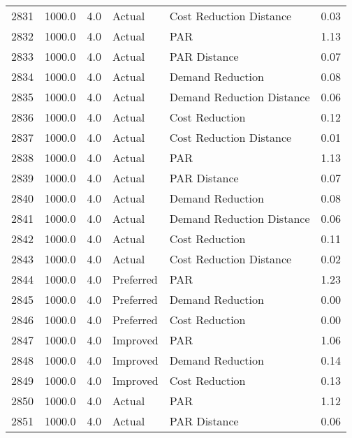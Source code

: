 \begin{longtable}{lrrllr}
2831 &       1000.0 &     4.0 &         Actual &    Cost Reduction Distance &   0.03 \\
2832 &       1000.0 &     4.0 &         Actual &                        PAR &   1.13 \\
2833 &       1000.0 &     4.0 &         Actual &               PAR Distance &   0.07 \\
2834 &       1000.0 &     4.0 &         Actual &           Demand Reduction &   0.08 \\
2835 &       1000.0 &     4.0 &         Actual &  Demand Reduction Distance &   0.06 \\
2836 &       1000.0 &     4.0 &         Actual &             Cost Reduction &   0.12 \\
2837 &       1000.0 &     4.0 &         Actual &    Cost Reduction Distance &   0.01 \\
2838 &       1000.0 &     4.0 &         Actual &                        PAR &   1.13 \\
2839 &       1000.0 &     4.0 &         Actual &               PAR Distance &   0.07 \\
2840 &       1000.0 &     4.0 &         Actual &           Demand Reduction &   0.08 \\
2841 &       1000.0 &     4.0 &         Actual &  Demand Reduction Distance &   0.06 \\
2842 &       1000.0 &     4.0 &         Actual &             Cost Reduction &   0.11 \\
2843 &       1000.0 &     4.0 &         Actual &    Cost Reduction Distance &   0.02 \\
2844 &       1000.0 &     4.0 &      Preferred &                        PAR &   1.23 \\
2845 &       1000.0 &     4.0 &      Preferred &           Demand Reduction &   0.00 \\
2846 &       1000.0 &     4.0 &      Preferred &             Cost Reduction &   0.00 \\
2847 &       1000.0 &     4.0 &       Improved &                        PAR &   1.06 \\
2848 &       1000.0 &     4.0 &       Improved &           Demand Reduction &   0.14 \\
2849 &       1000.0 &     4.0 &       Improved &             Cost Reduction &   0.13 \\
2850 &       1000.0 &     4.0 &         Actual &                        PAR &   1.12 \\
2851 &       1000.0 &     4.0 &         Actual &               PAR Distance &   0.06 \\

\end{longtable}

